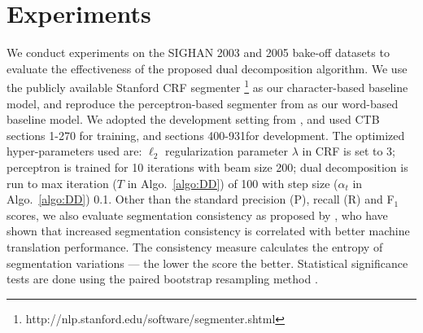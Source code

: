 \section{Experiments}


We conduct experiments on the SIGHAN 2003 \cite{Sproat:2003:SIGHAN} and 2005 \cite{Emerson:2005:SIGHAN} bake-off datasets to evaluate the effectiveness of the proposed dual decomposition algorithm. We use the publicly available Stanford CRF segmenter \cite{Tseng:2005:SIGHAN}\footnote{http://nlp.stanford.edu/software/segmenter.shtml} as our character-based baseline model, and reproduce the perceptron-based segmenter from  as our word-based baseline model.
We adopted the development setting from \cite{Zhang:2007:ACL}, and used CTB sections 1-270 for training, and sections 400-931for development. The optimized hyper-parameters used are: $\ell_{2}$ regularization parameter $\lambda$ in CRF is set to $3$; perceptron is trained for 10 iterations with beam size 200; dual decomposition is run to max iteration ($T$ in Algo.~\ref{algo:DD}) of 100 with step size ($\alpha_t$ in Algo.~\ref{algo:DD}) 0.1. Other than the standard precision (P), recall (R) and F$_1$ scores, we also evaluate segmentation consistency as proposed by \cite{Chang:2008:ACL}, who have shown that increased segmentation consistency is correlated with better machine translation performance. The consistency measure calculates the entropy of segmentation variations --- the lower the score the better. Statistical significance tests are done using the paired bootstrap resampling method \cite{efron93bootstrap}.